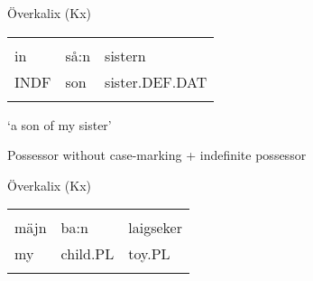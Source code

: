 \begin{listWWNumileveli}
\item {}

\begin{styleExample}
Överkalix (Kx)

\end{styleExample}

\end{listWWNumileveli}

\begin{tabular}{lll}
\lsptoprule
\multicolumn{3}{l}{{\bfseries\scshape possessee}

}\\
in & så:n & sistern\\
INDF & son & sister.DEF.DAT\\
\lspbottomrule
\end{tabular}

\begin{styleTranslation}
‘a son of my sister’

\end{styleTranslation}


\begin{listWWNumxiileveli}
\item {}

\begin{styleListii}
Possessor without case-marking + indefinite possessor

\end{styleListii}

\end{listWWNumxiileveli}

\begin{listWWNumileveli}
\item {}

\begin{styleExample}
Överkalix (Kx)

\end{styleExample}

\end{listWWNumileveli}

\begin{tabular}{lll}
\lsptoprule
\multicolumn{3}{l}{{\bfseries\scshape possessor}

}\\
mäjn & ba:n & laigseker\\
my & child.PL & toy.PL\\
\lspbottomrule
\end{tabular}


